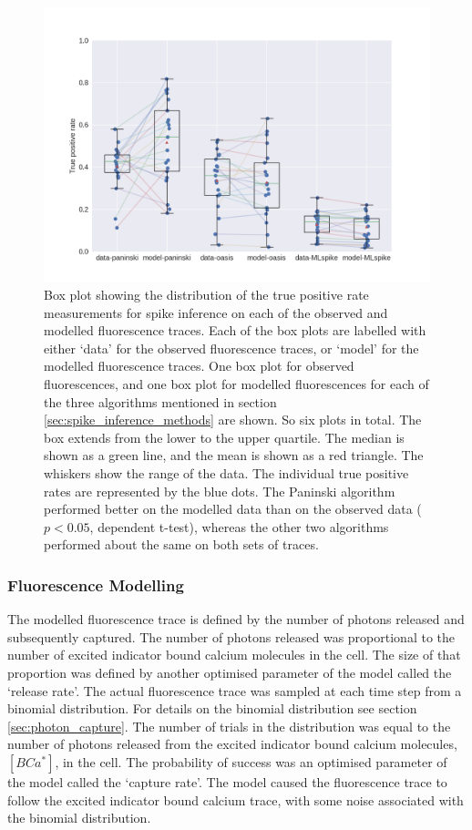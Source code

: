 \documentclass[a4paper,12pt]{article}
\theoremstyle{definition}
\begin{document}
\begin{figure}[p]
  \centering
  \includegraphics[width=\textwidth]{figures/three_algo_comparison_tp.png}
  \caption{Box plot showing the distribution of the true positive rate measurements for spike inference on each of the observed and modelled fluorescence traces. Each of the box plots are labelled with either `data' for the observed fluorescence traces, or `model' for the modelled fluorescence traces. One box plot for observed fluorescences, and one box plot for modelled fluorescences for each of the three algorithms mentioned in section \ref{sec:spike_inference_methods} are shown. So six plots in total. The box extends from the lower to the upper quartile. The median is shown as a green line, and the mean is shown as a red triangle. The whiskers show the range of the data. The individual true positive rates are represented by the blue dots. The Paninski algorithm performed better on the modelled data than on the observed data ($p < 0.05$, dependent t-test), whereas the other two algorithms performed about the same on both sets of traces.}
  \label{fig:three_algo_comparison_tp}
\end{figure}

\subsubsection{Fluorescence Modelling}
The modelled fluorescence trace is defined by the number of photons released and subsequently captured. The number of photons released was proportional to the number of excited indicator bound calcium molecules in the cell. The size of that proportion was defined by another optimised parameter of the model called the `release rate'. The actual fluorescence trace was sampled at each time step from a binomial distribution. For details on the binomial distribution see section \ref{sec:photon_capture}. The number of trials in the distribution was equal to the number of photons released from the excited indicator bound calcium molecules, $[BCa^*]$, in the cell. The probability of success was an optimised parameter of the model called the `capture rate'. The model caused the fluorescence trace to follow the excited indicator bound calcium trace, with some noise associated with the binomial distribution.
\end{document}
